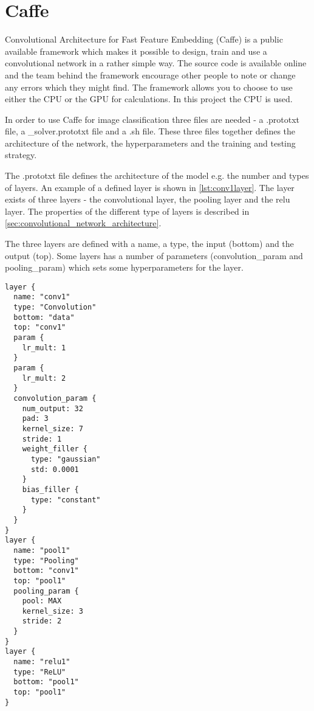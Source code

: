 \graphicspath{{Chapters/Project/}}

\section{Caffe} %
\label{sec:caffe}

Convolutional Architecture for Fast Feature Embedding (Caffe) is a public available framework which makes it possible to design, train and use a convolutional network in a rather simple way. The source code is available online and the team behind the framework encourage other people to note or change any errors which they might find. The framework allows you to choose to use either the CPU or the GPU for calculations. In this project the CPU is used.

In order to use Caffe for image classification three files are needed - a .prototxt file, a \_solver.prototxt file and a .sh file. These three files together defines the architecture of the network, the hyperparameters and the training and testing strategy.

The .prototxt file defines the architecture of the model e.g. the number and types of layers. An example of a defined layer is shown in \autoref{lst:conv1layer}. The layer exists of three layers - the convolutional layer, the pooling layer and the relu layer. The properties of the different type of layers is described in \autoref{sec:convolutional_network_architecture}.

The three layers are defined with a name, a type, the input (bottom) and the output (top). Some layers has a number of parameters (convolution\_param and pooling\_param) which sets some hyperparameters for the layer.

\begin{lstlisting}[caption = A code snippet from the file  cifar10\_quick\_train\_test.prototxt from the Cifar-10 tutorial provided by the framework. This code snippet defines the first convolutional layer in the network., label={lst:conv1layer}]
layer {
  name: "conv1"
  type: "Convolution"
  bottom: "data"
  top: "conv1"
  param {
    lr_mult: 1
  }
  param {
    lr_mult: 2
  }
  convolution_param {
    num_output: 32
    pad: 3
    kernel_size: 7
    stride: 1
    weight_filler {
      type: "gaussian"
      std: 0.0001
    }
    bias_filler {
      type: "constant"
    }
  }
}
layer {
  name: "pool1"
  type: "Pooling"
  bottom: "conv1"
  top: "pool1"
  pooling_param {
    pool: MAX
    kernel_size: 3
    stride: 2
  }
}
layer {
  name: "relu1"
  type: "ReLU"
  bottom: "pool1"
  top: "pool1"
}
\end{lstlisting}

